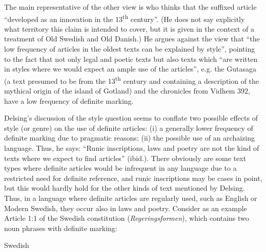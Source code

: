 \begin{styleBodytextC}
The main representative of the other view is \citet[938-939]{Delsing2002} who thinks that the suffixed article “developed as an innovation in the 13\textsuperscript{th} century”. (He does not say explicitly what territory this claim is intended to cover, but it is given in the context of a treatment of Old Swedish and Old Danish.) He argues against the view that “the low frequency of articles in the oldest texts can be explained by style”, pointing to the fact that not only legal and poetic texts but also texts which “are written in styles where we would expect an ample use of the articles”,  e.g. the Gutasaga (a text presumed to be from the 13\textsuperscript{th} century and containing a description of the mythical origin of the island of Gotland) and the chronicles from Vidhem 392, have a low frequency of definite marking. 

\end{styleBodytextC}

\begin{styleBodytextC}
Delsing’s discussion of the style question seems to conflate two possible effects of style (or genre) on the use of definite articles: (i) a generally lower frequency of definite marking due to pragmatic reasons; (ii) the possible use of an archaizing language. Thus, he says: “Runic inscriptions, laws and poetry are not the kind of texts where we expect to find articles” (ibid.). There obviously are some text types where definite articles would be infrequent in any language due to a restricted need for definite reference, and runic inscriptions may be cases in point, but this would hardly hold for the other kinds of text mentioned by Delsing. Thus, in a language where definite articles are regularly used, such as English or Modern Swedish, they occur also in laws and poetry. Consider as an example Article 1:1 of the Swedish constitution (\textit{Regeringsformen}), which contains two noun phrases with definite marking:

\end{styleBodytextC}

\begin{listWWNumileveli}
\item {}

\begin{styleExample}
Swedish

\end{styleExample}

\end{listWWNumileveli}


